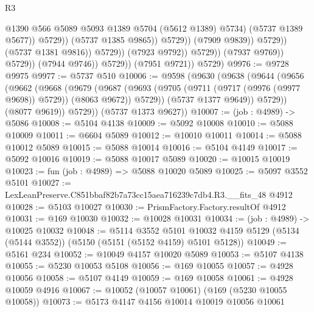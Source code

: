 \begin{lexlean}{R3}
\begin{coremodule}
                                                    @1390
                                                    @566
                                                    @5089
                                                    @5093
                                                    @1389
                                                    @5704
                                                    (@5612 @1389)
                                                    @5734)
                                                  (@5737 @1389 @5677))
                                                @5729))
                                            (@5737 @1385 @9865))
                                          @5729))
                                      (@7909 @9839))
                                    @5729))
                                (@5737 @1381 @9816))
                              @5729))
                          (@7923 @9792))
                        @5729))
                    (@7937 @9769))
                  @5729))
              (@7944 @9746))
            @5729))
        (@7951 @9721))
      @5729)
@9976 := @9728 @9975
@9977 := @5737 @510
@10006 := @9598
    (@9630
      (@9638
        (@9644
          (@9656
            (@9662
              (@9668
                (@9679
                  (@9687
                    (@9693 (@9705 (@9711 (@9717 (@9976 (@9977 @9698)) @5729)) (@8063 @9672)) @5729))
                  (@5737 @1377 @9649))
                @5729))
            (@8077 @9619))
          @5729))
      (@5737 @1373 @9627))
@10007 := (job : @4989) -> @5086
@10008 := @5104 @4138
@10009 := @5092 @10008
@10010 := @5088 @10009
@10011 := @6604 @5089
@10012 := @10010 @10011
@10014 := @5088 @10012 @5089
@10015 := @5088 @10014
@10016 := @5104 @4149
@10017 := @5092 @10016
@10019 := @5088 @10017 @5089
@10020 := @10015 @10019
@10023 := fun (job : @4989) => @5088 @10020 @5089
@10025 := @5097 @3552 @5101
@10027 := LexLeanPreserve.C851bbaf82b7a73cc15aea716239c7db4.R3.__fits_48 @4912
@10028 := @5103 @10027
@10030 := PrismFactory.Factory.resultOf @4912
@10031 := @169 @10030
@10032 := @10028 @10031
@10034 := (job : @4989) -> @10025 @10032
@10048 := @5114
    @3552
    @5101
    @10032
    @4159
    @5129
    (@5134 (@5144 @3552))
    (@5150 (@5151 (@5152 @4159) @5101 @5128))
@10049 := @5161 @234
@10052 := @10049 @4157 @10020 @5089
@10053 := @5107 @4138
@10055 := @5230 @10053 @5108
@10056 := @169 @10055
@10057 := @4928 @10056
@10058 := @5107 @4149
@10059 := @169 @10058
@10061 := @4928 @10059 @4916
@10067 := @10052 (@10057 @10061) (@169 (@5230 @10055 @10058))
@10073 := @5173 @4147 @4156 @10014 @10019 @10056 @10061

\end{coremodule}
\end{lexlean}

